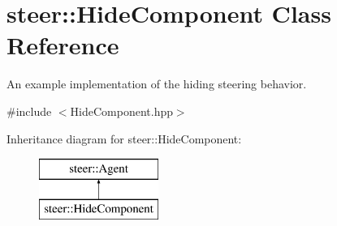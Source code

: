 \hypertarget{classsteer_1_1_hide_component}{\section{steer\-:\-:Hide\-Component Class Reference}
\label{classsteer_1_1_hide_component}
}


An example implementation of the hiding steering behavior.  




{\ttfamily \#include $<$Hide\-Component.\-hpp$>$}

Inheritance diagram for steer\-:\-:Hide\-Component\-:\begin{figure}[H]
\begin{center}
\leavevmode
\includegraphics[height=2.000000cm]{classsteer_1_1_hide_component}
\end{center}
\end{figure}

